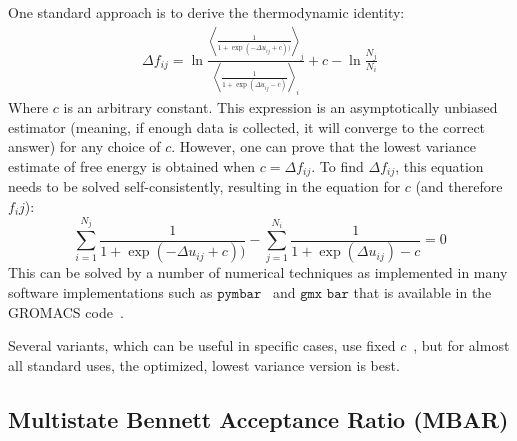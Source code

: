 \documentclass[9pt,review]{livecoms}
\begin{document}
One standard approach is to derive the thermodynamic identity:
\begin{eqnarray}
\Delta f_{ij} = \ln \frac{\left\langle \frac{1}{1 + \exp(-\Delta u_{ij}+c))}\right\rangle_j}{\left \langle \frac{1}{1 + \exp(\Delta u_{ij}-c)}\right\rangle_i} + c-\ln\frac{N_j}{N_i}
\end{eqnarray}
Where $c$ is an arbitrary constant. This expression is an asymptotically unbiased estimator (meaning, if enough data is collected, it will converge to the correct answer) for any choice
of $c$. However, one can prove that the lowest variance estimate of free energy is obtained when $c=\Delta f_{ij}$. To find $\Delta f_{ij}$, this equation needs to be solved self-consistently, resulting in the equation for $c$ (and therefore $f_ij$):
\begin{equation}
\sum_{i=1}^{N_j} \frac{1}{1 + \exp(-\Delta u_{ij}+c))} - \sum_{j=1}^{N_i} \frac{1}{1 + \exp(\Delta u_{ij})-c} = 0
\end{equation}
This can be solved by a number of numerical techniques as implemented in many software implementations such as $\texttt{pymbar}$~\cite{shirts-chodera:jcp:2008:mbar} and $\texttt{gmx bar}$ that is available in the GROMACS code~\cite{lindahl_2021}.

Several variants, which can be useful in specific cases, use fixed $c$~\cite{fenwick-escobedo:jcp:2003:replica-exchange-expanded-ensembles,Paliwal_comparison_2011}, but for almost all standard uses, the optimized, lowest variance version is best.


\subsection{Multistate Bennett Acceptance Ratio (MBAR)}
\end{document}
